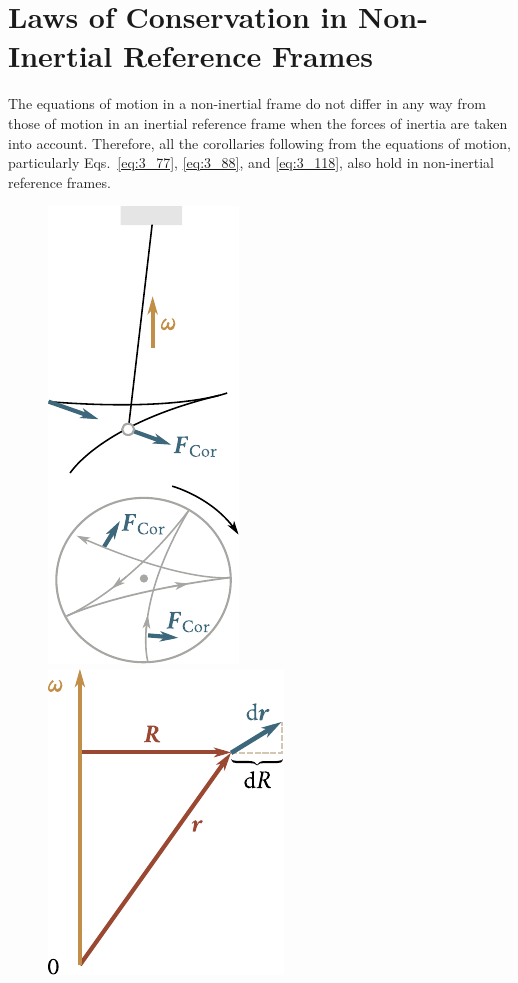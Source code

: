 \section{Laws of Conservation in Non-Inertial Reference Frames}\label{sec:4_4}

The equations of motion in a non-inertial frame do not differ in any way from those of motion in an inertial reference frame when the forces of inertia are taken into account. Therefore, all the corollaries following from the equations of motion, particularly Eqs.~\eqref{eq:3_77}, \eqref{eq:3_88}, and \eqref{eq:3_118}, also hold in non-inertial reference frames.

\begin{figure}[t]
	\begin{minipage}[t]{0.5\linewidth}
		\begin{center}
			\includegraphics[scale=0.95]{figures/ch_04/fig_4_11.pdf}
			\caption[]{}
			\label{fig:4_11}
		\end{center}
	\end{minipage}
	\hspace{-0.05cm}
	\begin{minipage}[t]{0.5\linewidth}
		\begin{center}
			\includegraphics[scale=0.95]{figures/ch_04/fig_4_12.pdf}

\end{center}
\end{minipage}
\end{figure}
